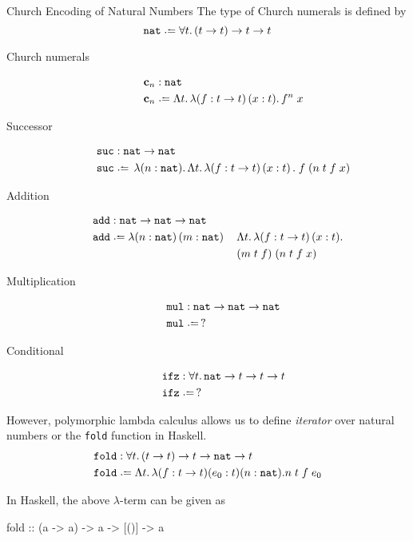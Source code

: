 \begin{frame}[allowframebreaks]{Church Encoding of Natural Numbers}
The type of Church numerals is defined by 
\[
  \nat \defeq \forall t.\, (t\to t)\to t\to t
\]
  \begin{description}
    \item[Church numerals]
      \begin{align*}
        \bc_n & : \nat \\
        \bc_n & \defeq \Lambda t.\,\lambda (f:t \to t)\,(x:t).\,
        f^n\;x
      \end{align*}
    \item[Successor]
      \begin{align*}
        \suc & : \nat \to \nat \\
        \suc & \defeq \,\lambda (n : \nat).\,\Lambda t.\,\lambda
        (f : t \to t)\,(x:t)\,.\;f\;(n\;t\;f\;x) 
      \end{align*}
    \item[Addition]
      \begin{align*}
        \add & : \nat \to \nat \to \nat \\
        \add & \defeq \lambda (n : \nat)\,(m:\nat)\,&& \Lambda t.\, \lambda
        (f:t\to t)\,(x: t).\\
        &&& (m\;t\;f)\;(n\;t\;f\;x) 
      \end{align*}
    \item[Multiplication] 
      \begin{align*}
       \mul & : \nat\to \nat \to\nat\\
       \mul & \defeq\,?
      \end{align*}
    \item[Conditional]
      \begin{align*}
       \ifz & : \forall t.\,\nat \to t \to t \to t \\
       \ifz & \defeq\,?
      \end{align*}
  \end{description}
However, polymorphic lambda calculus allows us to define
\emph{iterator} over natural numbers or the \texttt{fold} function in Haskell.
\begin{align*}
  \mathtt{fold} & : \forall t.\, (t \to t) \to t \to \nat \to t  \\
  \mathtt{fold} & \defeq \Lambda t.\, \lambda (f : t \to t)(e_0 : t)(n : \nat). 
  n\;t\;f\;e_0
\end{align*}

In Haskell, the above $\lambda$-term can be given as
\begin{semiverbatim}
  fold :: (a -> a) -> a -> [()] -> a


\end{semiverbatim}
\end{frame}
